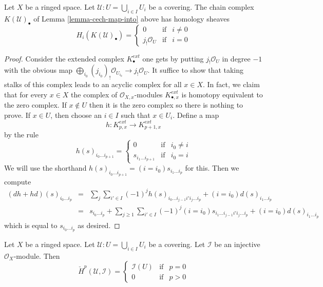 \begin{lemma}
\label{lemma-homology-complex}
Let $X$ be a ringed space.
Let $\mathcal{U} : U = \bigcup_{i \in I} U_i$ be a covering.
The chain complex $K(\mathcal{U})_\bullet$ of Lemma \ref{lemma-cech-map-into}
above has homology sheaves
$$
H_i(K(\mathcal{U})_\bullet) =
\left\{
\begin{matrix}
0 & \text{if} & i \not = 0 \\
j_!\mathcal{O}_U & \text{if} & i = 0
\end{matrix}
\right.
$$
\end{lemma}

\begin{proof}
Consider the extended complex $K^{ext}_\bullet$ one gets by putting
$j_!\mathcal{O}_U$ in degree $-1$ with the obvious map
$\bigoplus_{i_0} (j_{i_0})_!\mathcal{O}_{U_{i_0}} \to j_!\mathcal{O}_U$.
It suffice to show that taking stalks of this complex leads to an
acyclic complex for all $x \in X$. In fact, we claim that for every $x \in X$
the complex of $\mathcal{O}_{X, x}$-modules
$K^{ext}_{\bullet, x}$ is homotopy equivalent to the zero complex.
If $x \not \in U$ then it is the zero complex so there is nothing to
prove. If $x \in U$, then choose an $i \in I$ such that
$x \in U_i$. Define a map
$$
h : K^{ext}_{p, x} \longrightarrow K^{ext}_{p + 1, x}
$$
by the rule
$$
h(s)_{i_0 \ldots i_{p + 1}} =
\left\{
\begin{matrix}
0 & \text{if} & i_0 \not = i \\
s_{i_1 \ldots i_{p + 1}} & \text{if} & i_0 = i
\end{matrix}
\right.
$$
We will use the shorthand
$h(s)_{i_0 \ldots i_{p + 1}} = (i = i_0) s_{i_1 \ldots i_p}$ for this.
Then we compute
\begin{eqnarray*}
(dh + hd)(s)_{i_0 \ldots i_p}
& = &
\sum_j \sum_{i' \in I} (-1)^j h(s)_{i_0 \ldots i_{j - 1} i' i_j \ldots i_p}
+
(i = i_0) d(s)_{i_1 \ldots i_p} \\
& = &
s_{i_0 \ldots i_p} +
\sum_{j \geq 1}\sum_{i' \in I}
(-1)^j (i = i_0) s_{i_1 \ldots i_{j - 1} i' i_j \ldots i_p}
+
(i = i_0) d(s)_{i_1 \ldots i_p}
\end{eqnarray*}
which is equal to $s_{i_0 \ldots i_p}$ as desired.
\end{proof}

\begin{lemma}
\label{lemma-injective-trivial-cech}
Let $X$ be a ringed space.
Let $\mathcal{U} : U = \bigcup_{i \in I} U_i$ be a covering.
Let $\mathcal{I}$ be an injective $\mathcal{O}_X$-module.
Then
$$
\check{H}^p(\mathcal{U}, \mathcal{I}) =
\left\{
\begin{matrix}
\mathcal{I}(U) & \text{if} & p = 0 \\
0 & \text{if} & p > 0
\end{matrix}
\right.
$$
\end{lemma}


